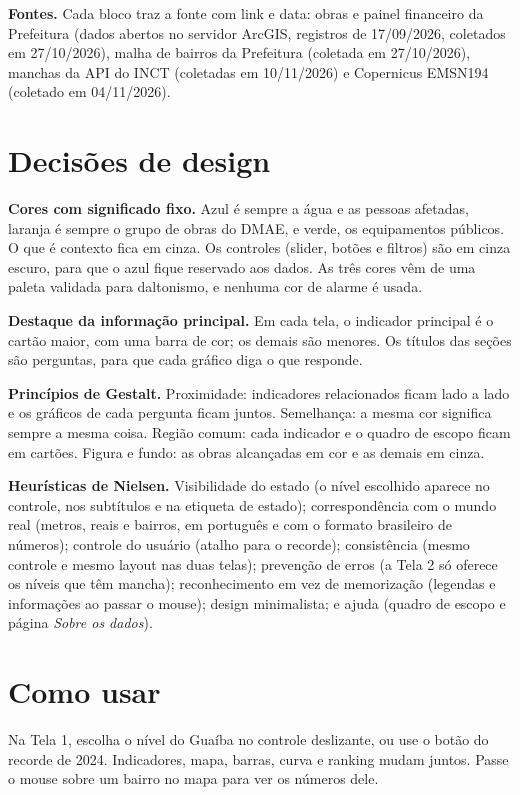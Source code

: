 \documentclass[11pt,a4paper]{article}
\begin{document}
\textbf{Fontes.} Cada bloco traz a fonte com link e data: obras e painel financeiro da Prefeitura (dados abertos no servidor ArcGIS, registros de 17/09/2026, coletados em 27/10/2026), malha de bairros da Prefeitura (coletada em 27/10/2026), manchas da API do INCT (coletadas em 10/11/2026) e Copernicus EMSN194 (coletado em 04/11/2026).

\section{Decisões de design}

\textbf{Cores com significado fixo.} Azul é sempre a água e as pessoas afetadas, laranja é sempre o grupo de obras do DMAE, e verde, os equipamentos públicos. O que é contexto fica em cinza. Os controles (slider, botões e filtros) são em cinza escuro, para que o azul fique reservado aos dados. As três cores vêm de uma paleta validada para daltonismo, e nenhuma cor de alarme é usada.

\textbf{Destaque da informação principal.} Em cada tela, o indicador principal é o cartão maior, com uma barra de cor; os demais são menores. Os títulos das seções são perguntas, para que cada gráfico diga o que responde.

\textbf{Princípios de Gestalt.} Proximidade: indicadores relacionados ficam lado a lado e os gráficos de cada pergunta ficam juntos. Semelhança: a mesma cor significa sempre a mesma coisa. Região comum: cada indicador e o quadro de escopo ficam em cartões. Figura e fundo: as obras alcançadas em cor e as demais em cinza.

\textbf{Heurísticas de Nielsen.} Visibilidade do estado (o nível escolhido aparece no controle, nos subtítulos e na etiqueta de estado); correspondência com o mundo real (metros, reais e bairros, em português e com o formato brasileiro de números); controle do usuário (atalho para o recorde); consistência (mesmo controle e mesmo layout nas duas telas); prevenção de erros (a Tela 2 só oferece os níveis que têm mancha); reconhecimento em vez de memorização (legendas e informações ao passar o mouse); design minimalista; e ajuda (quadro de escopo e página \emph{Sobre os dados}).

\section{Como usar}

Na Tela 1, escolha o nível do Guaíba no controle deslizante, ou use o botão do recorde de 2024. Indicadores, mapa, barras, curva e ranking mudam juntos. Passe o mouse sobre um bairro no mapa para ver os números dele.
\end{document}
